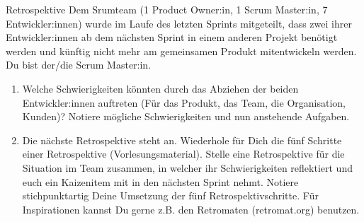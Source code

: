\documentclass{article}
\author{Leopold Lemmermann}
\begin{document}
\createtitle


\begin{exercise}{Retrospektive}
  Dem Srumteam (1 Product Owner:in, 1 Scrum Master:in, 7 Entwickler:innen) wurde im Laufe des letzten Sprints mitgeteilt, dass zwei ihrer Entwickler:innen ab dem nächsten Sprint in einem anderen Projekt benötigt werden und künftig nicht mehr am gemeinsamen Produkt mitentwickeln werden. Du bist der/die Scrum Master:in.

  \begin{enumerate}
    \item Welche Schwierigkeiten könnten durch das Abziehen der beiden Entwickler:innen auftreten (Für das Produkt, das Team, die Organisation, Kunden)? Notiere mögliche Schwierigkeiten und nun anstehende Aufgaben.
    \item Die nächste Retrospektive steht an. Wiederhole für Dich die fünf Schritte einer Retrospektive (Vorlesungsmaterial). Stelle eine Retrospektive für die Situation im Team zusammen, in welcher ihr Schwierigkeiten reflektiert und euch ein Kaizenitem mit in den nächsten Sprint nehmt. Notiere stichpunktartig Deine Umsetzung der fünf Retrospektivschritte. Für Inspirationen kannst Du gerne z.B. den Retromaten (retromat.org) benutzen.
  \end{enumerate}


\end{exercise}
\end{document}
